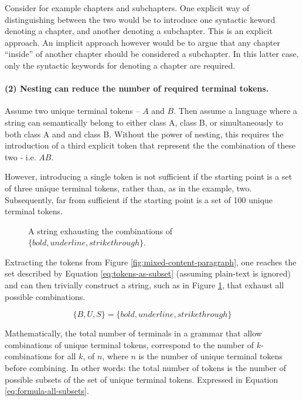 \documentclass{scrreprt}
\begin{document}
Consider for example chapters and subchapters. One explicit way of distinguishing between the two would be to introduce one syntactic keword denoting a chapter, and another denoting a subchapter. This is an explicit approach. An implicit approach however would be to argue that any chapter ``inside'' of another chapter should be considered a subchapter. In this latter case, only the syntactic keywords for denoting a chapter are required.


\paragraph{(2) Nesting can reduce the number of required terminal tokens.}
Assume two unique terminal tokens -- $A$ and $B$. Then assume a language where a string can semantically belong to either class A, class B, or simultaneously to both class A and and class B. Without the power of nesting, this requires the introduction of a third explicit token that represent the the combination of these two - i.e. $AB$.

However, introducing a single token is not sufficient if the starting point is a set of three unique terminal tokens, rather than, as in the example, two. Subsequently, far from sufficient if the starting point is a set of 100 unique terminal tokens.


\begin{figure}[h]
\centering
{}
\caption{A string exhausting the combinations of $\{bold, underline, strikethrough\}$.}
\label{fig:mixed-content-paragraph-complex}
\end{figure}


Extracting the tokens from Figure \ref{fig:mixed-content-paragraph}, one reaches the set described by Equation \ref{eq:tokens-as-subset} (assuming plain-text is ignored) and can then trivially construct a string, such as in Figure \ref{fig:mixed-content-paragraph-complex}, that exhaust all possible combinations.



\begin{equation}
\{B, U, S\} = \{bold, underline, strikethrough\}
\label{eq:tokens-as-subset}
\end{equation}



Mathematically, the total number of terminals in a grammar that allow combinations of unique terminal tokens, correspond to the number of $k$-combinations for all $k$, of $n$, where $n$ is the number of unique terminal tokens before combining. In other words: the total number of tokens is the number of possible subsets of the set of unique terminal tokens. Expressed in Equation \ref{eq:formula-all-subsets}.
\end{document}
